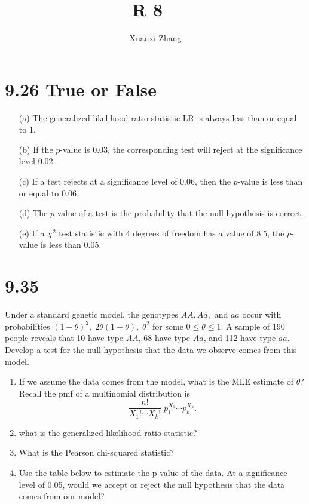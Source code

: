 \documentclass{article}%
\title{\huge R 8 \ \normalsize}
\author{Xuanxi Zhang}
\begin{document}
\maketitle

\section{9.26 True or False}
\begin{enumerate}
\item[(a)] The generalized likelihood ratio statistic LR is always less than or equal to 1.
\item[(b)] If the $p$-value is 0.03, the corresponding test will reject at the significance level 0.02.
\item[(c)] If a test rejects at a significance level of 0.06, then the $p$-value is less than or equal to 0.06.
\item[(d)] The $p$-value of a test is the probability that the null hypothesis is correct.
\item[(e)] If a $\chi^2$ test statistic with 4 degrees of freedom has a value of 8.5, the $p$-value is less than 0.05.
\end{enumerate}

\section{9.35}
Under a standard genetic model, the genotypes \(A A, A a,\) and \(a a\) occur with probabilities \((1-\theta)^2,\;2\theta(1-\theta),\;\theta^2\) for some \(0\le\theta\le1\). A sample of 190 people reveals that 10 have type \(A A\), 68 have type \(A a\), and 112 have type \(a a\). Develop a test for the null hypothesis that the data we observe comes from this model.

\begin{enumerate}
\item If we assume the data comes from the model, what is the MLE estimate of \(\theta\)? Recall the pmf of a multinomial distribution is
\[
\frac{n!}{X_1!\cdots X_k!}\; p_1^{X_1}\cdots p_k^{X_k}.
\]

\item what is the generalized likelihood ratio statistic?

\item What is the Pearson chi-squared statistic?

\item Use the table below to estimate the p-value of the data. At a significance level of 0.05, would we accept or reject the null hypothesis that the data comes from our model?
\end{enumerate}
\end{document}

